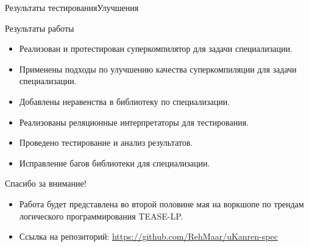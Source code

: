 \documentclass[xcolor=table]{beamer}
\begin{document}
\begin{frame}{Результаты тестирования}{Улучшения}
%
%
%
\end{frame}


%
\begin{frame}{Результаты работы}
  \begin{itemize}
  \item Реализован и протестирован суперкомпилятор для задачи специализации.
  \item Применены подходы по улучшению качества суперкомпиляции для задачи специализации.
  \item Добавлены неравенства в библиотеку по специализации.
  \item Реализованы реляционные интерпретаторы для тестирования.
  \item Проведено тестирование и анализ результатов.
  \item Исправление багов библиотеки для специализации.
  \end{itemize}
\end{frame}

\begin{frame}{Спасибо за внимание!}
\begin{itemize}
\item Работа будет представлена во второй половине мая на воркшопе по трендам логического программирования TEASE-LP.
\item Ссылка на репозиторий: \url{https://github.com/RehMaar/uKanren-spec}
\end{itemize}
\end{frame}


\end{document}
